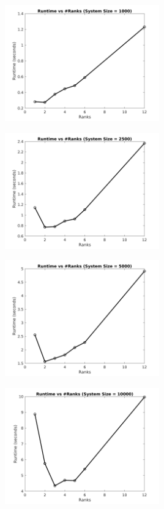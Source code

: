\documentclass[sigplan,screen]{acmart}
\begin{document}
\begin{figure}
	\begin{subfigure}{0.4\textwidth}
		\includegraphics[trim= 20 5 35 10,clip, width=0.95\linewidth, height=5cm]{plots/MPI_strong_1k.png} 
		\caption{}
	\end{subfigure}
	\begin{subfigure}{0.4\textwidth}
		\includegraphics[trim= 20 5 35 10,clip, width=0.95\linewidth, height=5cm]{plots/MPI_strong_2k.png}
		\caption{}
	\end{subfigure}
	\begin{subfigure}{0.4\textwidth}
		\includegraphics[trim= 20 5 35 10,clip, width=0.95\linewidth, height=5cm]{plots/MPI_strong_5k.png}
		\caption{}
	\end{subfigure}
	\begin{subfigure}{0.4\textwidth}
		\includegraphics[trim= 20 5 35 10,clip, width=0.95\linewidth, height=5cm]{plots/MPI_strong_10k.png}

\end{subfigure}
\end{figure}
\end{document}
